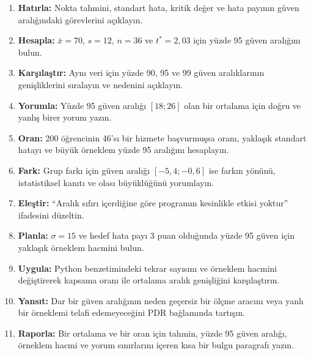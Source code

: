\begin{enumerate}
\renewcommand{\labelenumi}{\textbf{\Alph{enumi}.}}
  \item \textbf{Hatırla:} Nokta tahmini, standart hata, kritik değer ve hata payının güven aralığındaki görevlerini açıklayın.
  \item \textbf{Hesapla:} $\bar x=70$, $s=12$, $n=36$ ve $t^*=2{,}03$ için yüzde 95 güven aralığını bulun.
  \item \textbf{Karşılaştır:} Aynı veri için yüzde 90, 95 ve 99 güven aralıklarının genişliklerini sıralayın ve nedenini açıklayın.
  \item \textbf{Yorumla:} Yüzde 95 güven aralığı $[18;26]$ olan bir ortalama için doğru ve yanlış birer yorum yazın.
  \item \textbf{Oran:} 200 öğrencinin 46'sı bir hizmete başvurmuşsa oranı, yaklaşık standart hatayı ve büyük örneklem yüzde 95 aralığını hesaplayın.
  \item \textbf{Fark:} Grup farkı için güven aralığı $[-5{,}4;-0{,}6]$ ise farkın yönünü, istatistiksel kanıtı ve olası büyüklüğünü yorumlayın.
  \item \textbf{Eleştir:} ``Aralık sıfırı içerdiğine göre programın kesinlikle etkisi yoktur'' ifadesini düzeltin.
  \item \textbf{Planla:} $\sigma=15$ ve hedef hata payı 3 puan olduğunda yüzde 95 güven için yaklaşık örneklem hacmini bulun.
  \item \textbf{Uygula:} Python benzetimindeki tekrar sayısını ve örneklem hacmini değiştirerek kapsama oranı ile ortalama aralık genişliğini karşılaştırın.
  \item \textbf{Yansıt:} Dar bir güven aralığının neden geçersiz bir ölçme aracını veya yanlı bir örneklemi telafi edemeyeceğini PDR bağlamında tartışın.
  \item \textbf{Raporla:} Bir ortalama ve bir oran için tahmin, yüzde 95 güven aralığı, örneklem hacmi ve yorum sınırlarını içeren kısa bir bulgu paragrafı yazın.
\end{enumerate}

